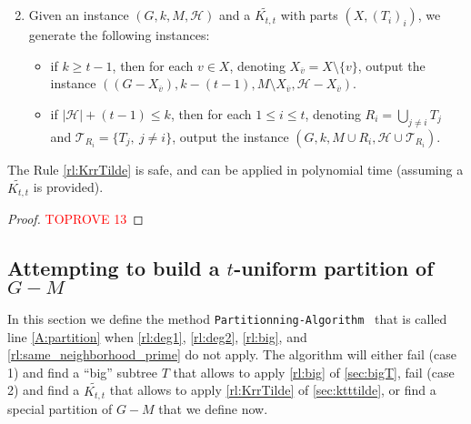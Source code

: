 \documentclass{amsart}
\newcommand{\BR}[1]{BR$_ #1$}
\newcommand{\algopart }{\texttt{Partitionning-Algorithm}~ }
\newcommand{\mT}{\mathcal{T}}
\newcommand{\mH}{\mathcal{H}}
\newcommand{\KttTilde}{\widetilde{K_{t,t}}}
\newcommand{\ruleref}[1]{\hyperref[#1]{\ref*{#1}}}
\begin{document}
\begin{enumerate}[label=(\BR{{\arabic*}})]
\setcounter{enumi}{1}
\item \label{rl:KrrTilde} Given an instance $(G, k, M, \mH)$ and a $\KttTilde$ with parts $(X, (T_i)_i)$, we generate the following instances:
\begin{itemize}
    \item if $k \ge t-1$, then for each $v\in X$, denoting $X_{\overline{v}}=X\setminus \{v\}$, output the instance $((G-X_{\overline{v}}), k-(t-1), M\setminus X_{\overline{v}}, \mH-X_{\overline{v}})$.
    \item if $|\mH|+(t-1) \le k$, then for each $1\leq i \leq t$, denoting $R_i=\bigcup_{j\neq i}T_j$ and $\mT_{R_i}=\{T_j,~j\neq i\}$, output the instance $\left(G, k, M\cup R_i, \mH\cup \mT_{R_i}\right)$.
\end{itemize}
\end{enumerate}

\begin{lemma}
    The Rule \ruleref{rl:KrrTilde} is safe, and can be applied in polynomial time (assuming a $\KttTilde$ is provided).
\end{lemma}
\begin{proof}\textcolor{red}{TOPROVE 13}\end{proof}


\subsection{Attempting to build a \texorpdfstring{$t$}{t}-uniform partition of  \texorpdfstring{$G-M$}{G-M}}
\label{sssec:partition-algo}
In this section we define the method \algopart that is called line \ref{A:partition} when \ruleref{rl:deg1}, \ruleref{rl:deg2}, \ruleref{rl:big}, and \ruleref{rl:same_neighborhood_prime} do not apply.
The algorithm will either fail (case 1) and find a ``big'' subtree $T$ that allows to apply \ruleref{rl:big} of \autoref{sec:bigT}, fail (case 2) and find a $\KttTilde$ that allows to apply \ruleref{rl:KrrTilde} of \autoref{sec:ktttilde}, or find a special partition of $G-M$ that we define now.
\end{document}

